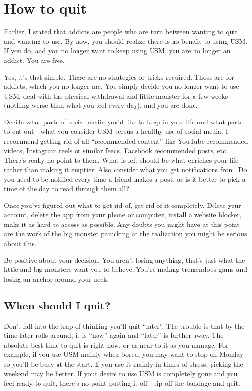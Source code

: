 \documentclass[
]{book}
\begin{document}
\chapter{How to quit}\label{how-to-quit}

Earlier, I stated that addicts are people who are torn between wanting to quit and wanting to use. By now, you should realize there is no benefit to using USM. If you do, and you no longer want to keep using USM, you are no longer an addict. You are free.

Yes, it's that simple. There are no strategies or tricks required. Those are for addicts, which you no longer are. You simply decide you no longer want to use USM, deal with the physical withdrawal and little monster for a few weeks (nothing worse than what you feel every day), and you are done.

Decide what parts of social media you'd like to keep in your life and what parts to cut out - what you consider USM versus a healthy use of social media. I recommend getting rid of all ``recommended content'' like YouTube recommended videos, Instagram reels or similar feeds, Facebook recommended posts, etc. There's really no point to them. What is left should be what enriches your life rather than making it emptier. Also consider what you get notifications from. Do you need to be notified every time a friend makes a post, or is it better to pick a time of the day to read through them all?

Once you've figured out what to get rid of, get rid of it completely. Delete your account, delete the app from your phone or computer, install a website blocker, make it as hard to access as possible. Any doubts you might have at this point are the work of the big monster panicking at the realization you might be serious about this.

Be positive about your decision. You aren't losing anything, that's just what the little and big monsters want you to believe. You're making tremendous gains and losing an anchor around your neck.

\section{When should I quit?}\label{when-should-i-quit}

Don't fall into the trap of thinking you'll quit ``later''. The trouble is that by the time later rolls around, it is ``now'' again and ``later'' is further away. The absolute best time to quit is right now, or as near to it as you manage. For example, if you use USM mainly when bored, you may want to stop on Monday so you'll be busy at the start. If you use it mainly in times of stress, picking the weekend may be better. If your desire to use USM is completely gone and you feel ready to quit, there's no point putting it off - rip off the bandage and quit.
\end{document}
